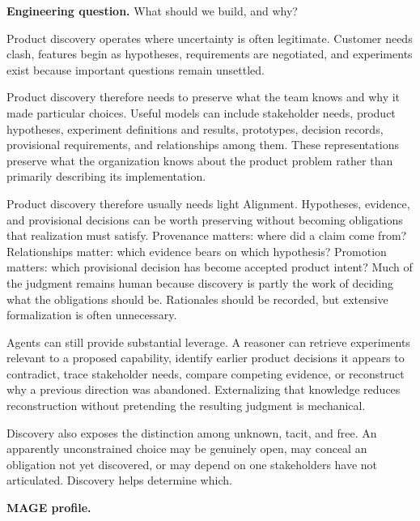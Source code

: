 

\textbf{Engineering question.} What should we build, and why?

Product discovery operates where uncertainty is often legitimate. Customer needs clash, features begin as hypotheses, requirements are negotiated, and experiments exist because important questions remain unsettled.

Product discovery therefore needs to preserve what the team knows and why it made particular choices. Useful models can include stakeholder needs, product hypotheses, experiment definitions and results, prototypes, decision records, provisional requirements, and relationships among them. These representations preserve what the organization knows about the product problem rather than primarily describing its implementation.

Product discovery therefore usually needs light Alignment. Hypotheses, evidence, and provisional decisions can be worth preserving without becoming obligations that realization must satisfy. Provenance matters: where did a claim come from? Relationships matter: which evidence bears on which hypothesis? Promotion matters: which provisional decision has become accepted product intent? Much of the judgment remains human because discovery is partly the work of deciding what the obligations should be. Rationales should be recorded, but extensive formalization is often unnecessary.

Agents can still provide substantial leverage. A reasoner can retrieve experiments relevant to a proposed capability, identify earlier product decisions it appears to contradict, trace stakeholder needs, compare competing evidence, or reconstruct why a previous direction was abandoned. Externalizing that knowledge reduces reconstruction without pretending the resulting judgment is mechanical.

Discovery also exposes the distinction among unknown, tacit, and free. An apparently unconstrained choice may be genuinely open, may conceal an obligation not yet discovered, or may depend on one stakeholders have not articulated. Discovery helps determine which.

\textbf{MAGE profile.}

